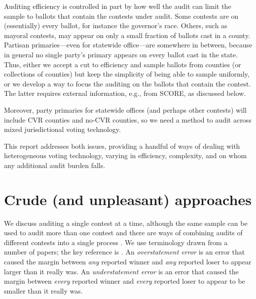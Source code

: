 \documentclass[12pt]{article}
\begin{document}
Auditing efficiency is controlled in part by how well the audit can limit the sample to ballots that
contain the contests under audit.
Some contests are on (essentially) every ballot, for instance the governor's race.
Others, such as mayoral contests, may appear on only a small fraction of ballots cast in
a county.
Partisan primaries---even for statewide office---are somewhere in between,
because in general no single party's primary appears on every ballot cast in the state.
Thus, either we accept a cut to efficiency and sample ballots from counties (or collections of counties)
but keep the simplicity of being able to sample uniformly, or we develop a way to
focus the auditing on the ballots that contain the contest.
The latter requires external information, e.g., from SCORE,
as discussed below.

Moreover, party primaries for statewide offices (and perhaps other contests) will
include CVR counties and no-CVR counties, so we need a method to audit
across mixed jurisdictional voting technology.

This report addresses both issues, providing a handful of ways of dealing with heterogeneous
voting technology, varying in efficiency, complexity, and on whom any additional audit burden falls.

\section{Crude (and unpleasant) approaches} \label{sec:crude}
We discuss auditing a single contest at a time, although the same sample can be used to audit
more than one contest and there are ways of combining audits of different contests into
a single process \citep{stark09c,stark10d}.
We use terminology drawn from a number of papers; the key reference is \citet{lindemanStark12}.
An \emph{overstatement error} is an error that caused the margin between \emph{any} reported
winner and \emph{any} reported loser to appear larger than it really was.
An \emph{understatement error} is an error that caused the margin between \emph{every} reported
winner and \emph{every} reported loser to appear to be smaller than it really was.
\end{document}

